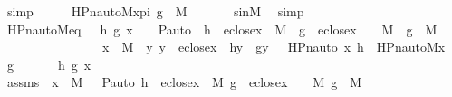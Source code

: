 \begin{isabellebody}
\ simp\isanewline
\isanewline
\ \ \isamarkupfalse%
\ \isamarkupfalse%
\ {\isachardoublequoteopen}HPn{\isacharunderscore}{\kern0pt}auto{\isacharunderscore}{\kern0pt}M{\isacharparenleft}{\kern0pt}x{\isacharunderscore}{\kern0pt}pi{\isacharcomma}{\kern0pt}\ g{\isacharparenright}{\kern0pt}\ {\isasymin}\ M{\isachardoublequoteclose}\ \isanewline
\ \ \ \ \isamarkupfalse%
\ sinM\ \isamarkupfalse%
\ simp\ \isanewline
{}\isamarkupfalse%
%
\endisatagproof
{\isafoldproof}%
%
\isadelimproof
\isanewline
%
\endisadelimproof
\isanewline
{}\isamarkupfalse%
\ HPn{\isacharunderscore}{\kern0pt}auto{\isacharunderscore}{\kern0pt}M{\isacharunderscore}{\kern0pt}eq\ {\isacharcolon}{\kern0pt}\ \ {\isachardoublequoteopen}{\isasymAnd}h\ g\ x\ {\isasympi}{\isachardot}{\kern0pt}\ {\isasympi}\ {\isasymin}\ P{\isacharunderscore}{\kern0pt}auto\ {\isasymLongrightarrow}\ h\ {\isasymin}\ eclose{\isacharparenleft}{\kern0pt}x{\isacharparenright}{\kern0pt}\ {\isasymrightarrow}\ M\ {\isasymLongrightarrow}\ g\ {\isasymin}\ eclose{\isacharparenleft}{\kern0pt}x{\isacharparenright}{\kern0pt}\ {\isasymtimes}\ {\isacharbraceleft}{\kern0pt}{\isasympi}{\isacharbraceright}{\kern0pt}\ {\isasymrightarrow}\ M\ {\isasymLongrightarrow}\ g\ {\isasymin}\ M\ \ \isanewline
\ \ \ \ \ \ \ \ \ \ \ \ \ \ \ {\isasymLongrightarrow}\ x\ {\isasymin}\ M\ {\isasymLongrightarrow}\ {\isacharparenleft}{\kern0pt}{\isasymAnd}y{\isachardot}{\kern0pt}\ y\ {\isasymin}\ eclose{\isacharparenleft}{\kern0pt}x{\isacharparenright}{\kern0pt}\ {\isasymLongrightarrow}\ h{\isacharbackquote}{\kern0pt}y\ {\isacharequal}{\kern0pt}\ g{\isacharbackquote}{\kern0pt}{\isacharless}{\kern0pt}y{\isacharcomma}{\kern0pt}\ {\isasympi}{\isachargreater}{\kern0pt}{\isacharparenright}{\kern0pt}\ {\isasymLongrightarrow}\ HPn{\isacharunderscore}{\kern0pt}auto{\isacharparenleft}{\kern0pt}{\isasympi}{\isacharcomma}{\kern0pt}\ x{\isacharcomma}{\kern0pt}\ h{\isacharparenright}{\kern0pt}\ {\isacharequal}{\kern0pt}\ HPn{\isacharunderscore}{\kern0pt}auto{\isacharunderscore}{\kern0pt}M{\isacharparenleft}{\kern0pt}{\isacharless}{\kern0pt}x{\isacharcomma}{\kern0pt}\ {\isasympi}{\isachargreater}{\kern0pt}{\isacharcomma}{\kern0pt}\ g{\isacharparenright}{\kern0pt}{\isachardoublequoteclose}\isanewline
%
\isadelimproof
%
\endisadelimproof
%
\isatagproof
{}\isamarkupfalse%
\ {\isacharminus}{\kern0pt}\ \isanewline
\ \ \isamarkupfalse%
\ h\ g\ x\ {\isasympi}\isanewline
\ \ \isamarkupfalse%
\ assms{}\ {\isacharcolon}{\kern0pt}\ {\isachardoublequoteopen}x\ {\isasymin}\ M{\isachardoublequoteclose}\ {\isachardoublequoteopen}{\isasympi}\ {\isasymin}\ P{\isacharunderscore}{\kern0pt}auto{\isachardoublequoteclose}\ {\isachardoublequoteopen}h\ {\isasymin}\ eclose{\isacharparenleft}{\kern0pt}x{\isacharparenright}{\kern0pt}\ {\isasymrightarrow}\ M{\isachardoublequoteclose}\ {\isachardoublequoteopen}g\ {\isasymin}\ eclose{\isacharparenleft}{\kern0pt}x{\isacharparenright}{\kern0pt}\ {\isasymtimes}\ {\isacharbraceleft}{\kern0pt}{\isasympi}{\isacharbraceright}{\kern0pt}\ {\isasymrightarrow}\ M{\isachardoublequoteclose}\ {\isachardoublequoteopen}g\ {\isasymin}\ M{\isachardoublequoteclose}\ \isanewline

\end{isabellebody}
